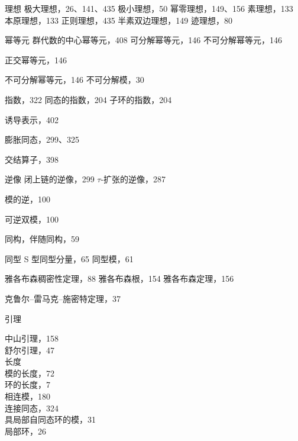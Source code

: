 理想 极大理想，26、141、435 极小理想，50 幂零理想，149、156 素理想，133 本原理想，133 正则理想，435 半素双边理想，149 迹理想，80

幂等元 群代数的中心幂等元，408 可分解幂等元，146 不可分解幂等元，146

正交幂等元，146

不可分解幂等元，146 不可分解模，30

指数，322 同态的指数，204 子环的指数，204

诱导表示，402

膨胀同态，299、325

交结算子，398

逆像 闭上链的逆像，299 \(\tau\)-扩张的逆像，287

模的逆，100

可逆双模，100

同构，伴随同构，59

同型 S 型同型分量，65 同型模，61


雅各布森稠密性定理，88 雅各布森根，154 雅各布森定理，156


克鲁尔–雷马克–施密特定理，37


引理

中山引理，158\\
舒尔引理，47\\
长度\\
模的长度，72\\
环的长度，7\\
相连模，180\\
连接同态，324\\
具局部自同态环的模，31\\
局部环，26


